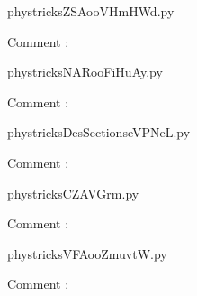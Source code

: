 
    \newcommand{\CaptionFigZSAooVHmHWd}{<+Type your caption here+>}
    \begin{center}
        
    \end{center}
    phystricksZSAooVHmHWd.py

    Comment : 

    \clearpage
    


    \newcommand{\CaptionFigNARooFiHuAy}{<+Type your caption here+>}
    \begin{center}
        
    \end{center}
    phystricksNARooFiHuAy.py

    Comment : 

    \clearpage
    


    \newcommand{\CaptionFigDesSectionseVPNeL}{<+Type your caption here+>}
    \begin{center}
        
    \end{center}
    phystricksDesSectionseVPNeL.py

    Comment : 

    \clearpage
    


    \newcommand{\CaptionFigCZAVGrm}{<+Type your caption here+>}
    \begin{center}
        
    \end{center}
    phystricksCZAVGrm.py

    Comment : 

    \clearpage
    


    \newcommand{\CaptionFigVFAooZmuvtW}{<+Type your caption here+>}
    \begin{center}
        
    \end{center}
    phystricksVFAooZmuvtW.py

    Comment : 

    \clearpage
    


